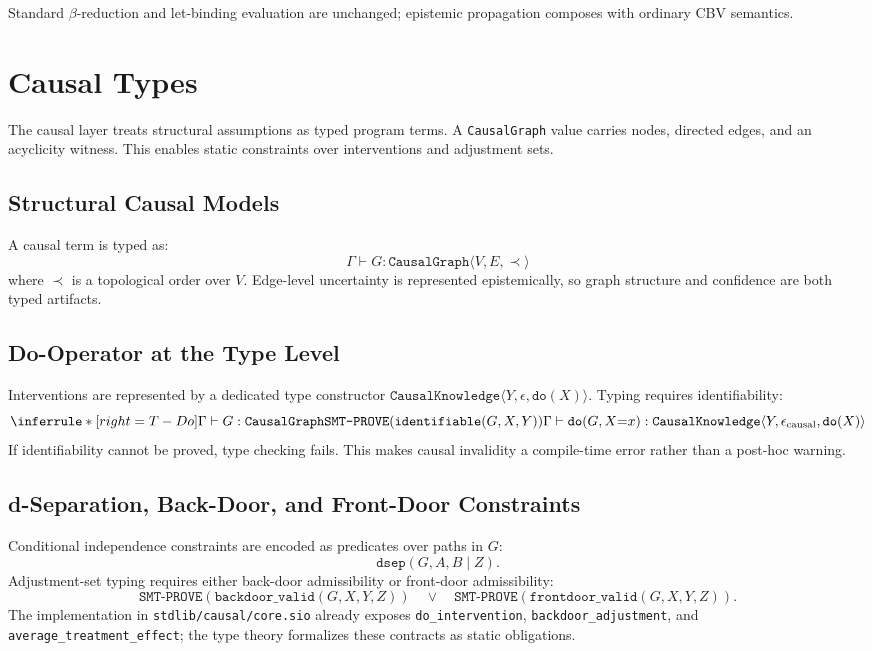 \documentclass[acmsmall,screen,review,anonymous]{acmart}
\newcommand{\cknow}[3]{\texttt{CausalKnowledge}\langle #1, #2, #3 \rangle}
\newcommand{\eps}{\epsilon}
\begin{document}
Standard $\beta$-reduction and let-binding evaluation are unchanged;
epistemic propagation composes with ordinary CBV semantics.

\section{Causal Types}
\label{sec:causal}

The causal layer treats structural assumptions as typed program terms.
A \texttt{CausalGraph} value carries nodes, directed edges, and an
acyclicity witness.
This enables static constraints over interventions and adjustment sets.

\subsection{Structural Causal Models}

A causal term is typed as:
\[
\Gamma \vdash G : \texttt{CausalGraph}\langle V,E,\prec \rangle
\]
where $\prec$ is a topological order over $V$.
Edge-level uncertainty is represented epistemically, so graph structure
and confidence are both typed artifacts.

\subsection{Do-Operator at the Type Level}

Interventions are represented by a dedicated type constructor
$\cknow{Y}{\eps}{\texttt{do}(X)}$.
Typing requires identifiability:
\[
\inferrule*[right=T-Do]
  {\Gamma \vdash G : \texttt{CausalGraph} \\
   \texttt{SMT-PROVE}(\texttt{identifiable}(G, X, Y))}
  {\Gamma \vdash \texttt{do}(G, X{=}x) :
   \cknow{Y}{\eps_{\text{causal}}}{\texttt{do}(X)}}
\]
If identifiability cannot be proved, type checking fails.
This makes causal invalidity a compile-time error rather than a
post-hoc warning.

\subsection{d-Separation, Back-Door, and Front-Door Constraints}

Conditional independence constraints are encoded as predicates over
paths in $G$:
\[
\texttt{dsep}(G, A, B \mid Z).
\]
Adjustment-set typing requires either back-door admissibility or
front-door admissibility:
\[
\texttt{SMT-PROVE}(\texttt{backdoor\_valid}(G,X,Y,Z))
\quad \lor \quad
\texttt{SMT-PROVE}(\texttt{frontdoor\_valid}(G,X,Y,Z)).
\]
The implementation in \texttt{stdlib/causal/core.sio} already exposes
\texttt{do\_intervention}, \texttt{backdoor\_adjustment}, and
\texttt{average\_treatment\_effect}; the type theory formalizes these
contracts as static obligations.
\end{document}
